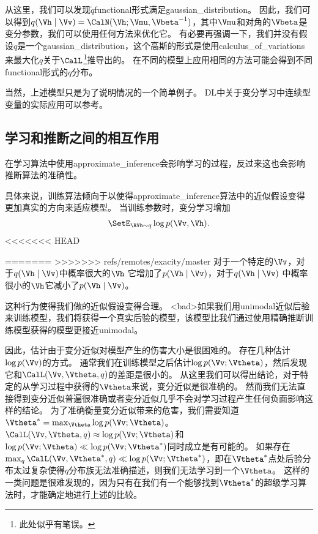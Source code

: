 从这里，我们可以发现$\tilde{q}$\gls{functional}形式满足\gls{gaussian_distribution}。
因此，我们可以得到$q(\Vh\mid\Vv) = \CalN(\Vh;\Vmu,\Vbeta^{-1})$，其中$\Vmu$和对角的$\Vbeta$是变分参数，我们可以使用任何方法来优化它。
有必要再强调一下，我们并没有假设$q$是一个\gls{gaussian_distribution}，这个高斯的形式是使用\gls{calculus_of_variations}来最大化$q$关于$\CalL$\footnote{此处似乎有笔误。}推导出的。
在不同的模型上应用相同的方法可能会得到不同\gls{functional}形式的$q$分布。

当然，上述模型只是为了说明情况的一个简单例子。
\gls{DL}中关于变分学习中连续型变量的实际应用可以参考\citet{Goodfeli-et-al-TPAMI-Deep-PrePrint-2013-small}。



\subsection{学习和推断之间的相互作用}
\label{sec:interactions_between_learning_and_inference}


在学习算法中使用\gls{approximate_inference}会影响学习的过程，反过来这也会影响推断算法的准确性。


具体来说，训练算法倾向于以使得\gls{approximate_inference}算法中的近似假设变得更加真实的方向来适应模型。
当训练参数时，变分学习增加
\begin{align}
\label{eqn:1968}
	\SetE_{\RVh \sim q}\log p(\Vv,\Vh).
\end{align}
<<<<<<< HEAD

=======
>>>>>>> refs/remotes/exacity/master
对于一个特定的$\Vv$，对于$q(\Vh \mid \Vv)$中概率很大的$\Vh$ 它增加了$p(\Vh\mid\Vv)$，对于$q(\Vh \mid \Vv) $ 中概率很小的$\Vh$它减小了$p(\Vh\mid\Vv)$。

这种行为使得我们做的近似假设变得合理。 %
<bad>如果我们用\gls{unimodal}近似后验来训练模型，我们将获得一个真实后验的模型，该模型比我们通过使用精确推断训练模型获得的模型更接近\gls{unimodal}。

	
因此，估计由于变分近似对模型产生的伤害大小是很困难的。
存在几种估计$\log p(\Vv)$的方式。
通常我们在训练模型之后估计$\log p(\Vv;\Vtheta)$，然后发现它和$\CalL(\Vv,\Vtheta,q)$的差距是很小的。
从这里我们可以得出结论，对于特定的从学习过程中获得的$\Vtheta$来说，变分近似是很准确的。
然而我们无法直接得到变分近似普遍很准确或者变分近似几乎不会对学习过程产生任何负面影响这样的结论。
为了准确衡量变分近似带来的危害，我们需要知道$\Vtheta^* = \max_{\Vtheta} \log p(\Vv;\Vtheta)$。
$\CalL(\Vv,\Vtheta,q)\approx \log p(\Vv;\Vtheta)$和$\log p(\Vv;\Vtheta)\ll \log p(\Vv;\Vtheta^*)$同时成立是有可能的。
如果存在$\max_q \CalL(\Vv,\Vtheta^*,q)\ll \log p(\Vv;\Vtheta^*)$，即在$\Vtheta^*$点处后验分布太过复杂使得$q$分布族无法准确描述，则我们无法学习到一个$\Vtheta$。
这样的一类问题是很难发现的，因为只有在我们有一个能够找到$\Vtheta^*$的超级学习算法时，才能确定地进行上述的比较。



